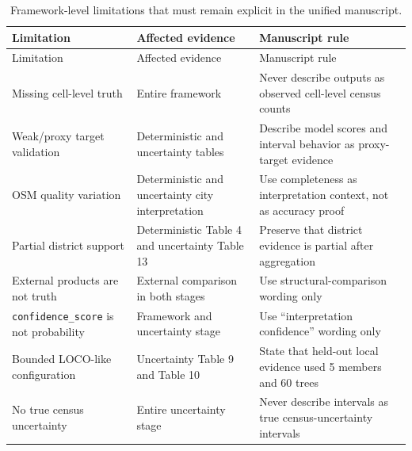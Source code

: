 \begin{longtable}{L{3.2cm}L{4.0cm}L{5.6cm}}
\caption{Framework-level limitations that must remain explicit in the unified manuscript.}\label{tab:s8-framework-limitations}\\
\toprule
Limitation & Affected evidence & Manuscript rule \\
\midrule
\endfirsthead
\toprule
Limitation & Affected evidence & Manuscript rule \\
\midrule
\endhead
Missing cell-level truth & Entire framework & Never describe outputs as observed cell-level census counts \\
Weak/proxy target validation & Deterministic and uncertainty tables & Describe model scores and interval behavior as proxy-target evidence \\
OSM quality variation & Deterministic and uncertainty city interpretation & Use completeness as interpretation context, not as accuracy proof \\
Partial district support & Deterministic Table 4 and uncertainty Table 13 & Preserve that district evidence is partial after aggregation \\
External products are not truth & External comparison in both stages & Use structural-comparison wording only \\
\texttt{confidence\_score} is not probability & Framework and uncertainty stage & Use ``interpretation confidence'' wording only \\
Bounded LOCO-like configuration & Uncertainty Table 9 and Table 10 & State that held-out local evidence used 5 members and 60 trees \\
No true census uncertainty & Entire uncertainty stage & Never describe intervals as true census-uncertainty intervals \\
\bottomrule
\end{longtable}

